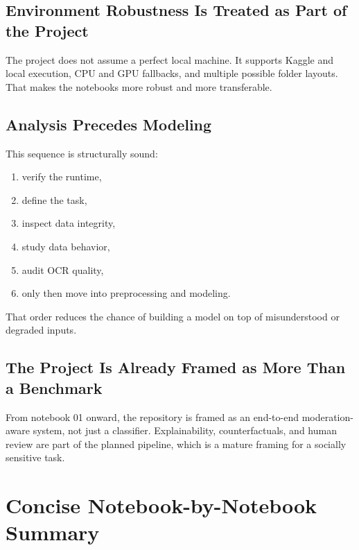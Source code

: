 \documentclass[11pt,a4paper]{report}
\begin{document}
\section{Environment Robustness Is Treated as Part of the Project}

The project does not assume a perfect local machine. It supports Kaggle and local execution, CPU and GPU fallbacks, and multiple possible folder layouts. That makes the notebooks more robust and more transferable.

\section{Analysis Precedes Modeling}

This sequence is structurally sound:

\begin{enumerate}[label=\arabic*.]
\item verify the runtime,
\item define the task,
\item inspect data integrity,
\item study data behavior,
\item audit OCR quality,
\item only then move into preprocessing and modeling.
\end{enumerate}

That order reduces the chance of building a model on top of misunderstood or degraded inputs.

\section{The Project Is Already Framed as More Than a Benchmark}

From notebook 01 onward, the repository is framed as an end-to-end moderation-aware system, not just a classifier. Explainability, counterfactuals, and human review are part of the planned pipeline, which is a mature framing for a socially sensitive task.

\chapter{Concise Notebook-by-Notebook Summary}
\end{document}
